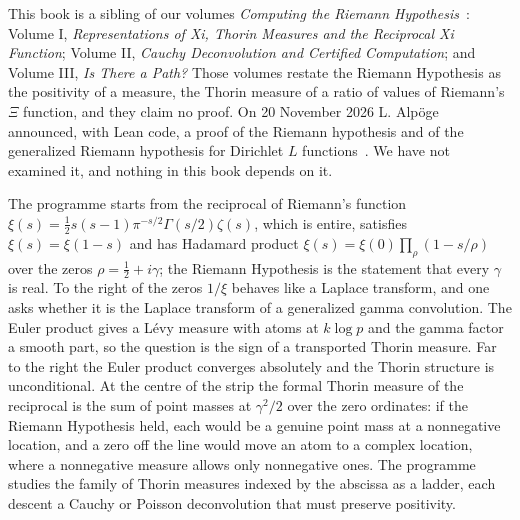 This book is a sibling of our volumes \emph{Computing the Riemann Hypothesis}~\cite{PS26a,PS26b,PS26c}: Volume I, \emph{Representations of Xi, Thorin Measures and the Reciprocal Xi Function}; Volume II, \emph{Cauchy Deconvolution and Certified Computation}; and Volume III, \emph{Is There a Path?} Those volumes restate the Riemann Hypothesis as the positivity of a measure, the Thorin measure of a ratio of values of Riemann's $\Xi$ function, and they claim no proof. On 20 November 2026 L. Alp\"oge announced, with Lean code, a proof of the Riemann hypothesis and of the generalized Riemann hypothesis for Dirichlet $L$ functions~\cite{Alp26}. We have not examined it, and nothing in this book depends on it.

The programme starts from the reciprocal of Riemann's function $\xi(s)=\frac12s(s-1)\pi^{-s/2}\Gamma(s/2)\zeta(s)$, which is entire, satisfies $\xi(s)=\xi(1-s)$ and has Hadamard product $\xi(s)=\xi(0)\prod_\rho(1-s/\rho)$ over the zeros $\rho=\frac12+i\gamma$; the Riemann Hypothesis is the statement that every $\gamma$ is real. To the right of the zeros $1/\xi$ behaves like a Laplace transform, and one asks whether it is the Laplace transform of a generalized gamma convolution. The Euler product gives a L\'evy measure with atoms at $k\log p$ and the gamma factor a smooth part, so the question is the sign of a transported Thorin measure. Far to the right the Euler product converges absolutely and the Thorin structure is unconditional. At the centre of the strip the formal Thorin measure of the reciprocal is the sum of point masses at $\gamma^2/2$ over the zero ordinates: if the Riemann Hypothesis held, each would be a genuine point mass at a nonnegative location, and a zero off the line would move an atom to a complex location, where a nonnegative measure allows only nonnegative ones. The programme studies the family of Thorin measures indexed by the abscissa as a ladder, each descent a Cauchy or Poisson deconvolution that must preserve positivity.

